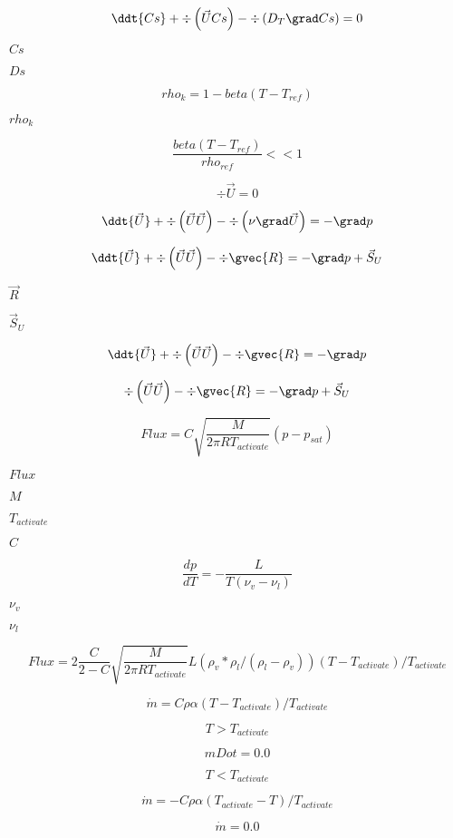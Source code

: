 \documentclass{article}
\begin{document}
\[ \ddt{Cs} + \div \left(\vec{U} Cs\right) - \div \left(D_T \grad Cs \right) = 0 \]
\pagebreak

$ Cs $
\pagebreak

$ Ds $
\pagebreak

\[ rho_{k} = 1 - beta(T - T_{ref}) \]
\pagebreak

$ rho_{k} $
\pagebreak

\[ \frac{beta(T - T_{ref})}{rho_{ref}} << 1 \]
\pagebreak

\[ \div \vec{U} = 0 \]
\pagebreak

\[ \ddt{\vec{U}} + \div \left( \vec{U} \vec{U} \right) - \div \left(\nu \grad \vec{U} \right) = - \grad p \]
\pagebreak

\[ \ddt{\vec{U}} + \div \left( \vec{U} \vec{U} \right) - \div \gvec{R} = - \grad p + \vec{S}_U \]
\pagebreak

$ \vec{R} $
\pagebreak

$ \vec{S}_U $
\pagebreak

\[ \ddt{\vec{U}} + \div \left( \vec{U} \vec{U} \right) - \div \gvec{R} = - \grad p \]
\pagebreak

\[ \div \left( \vec{U} \vec{U} \right) - \div \gvec{R} = - \grad p + \vec{S}_U \]
\pagebreak

\[ Flux = C \sqrt{\frac{M}{2 \pi R T_{activate}}}(p - p_{sat}) \]
\pagebreak

$ Flux $
\pagebreak

$ M $
\pagebreak

$ T_{activate} $
\pagebreak

$ C $
\pagebreak

\[ \frac{dp}{dT} = - \frac{L}{T (\nu_v - \nu_l)} \]
\pagebreak

$ \nu_v $
\pagebreak

$ \nu_l $
\pagebreak

\[ Flux = 2 \frac{C}{2 - C} \sqrt{\frac{M}{2 \pi R T_{activate}}} L (\rho_{v}*\rho_{l}/(\rho_{l} - \rho_{v})) (T - T_{activate})/T_{activate} \]
\pagebreak

\[ \dot{m} = C \rho \alpha (T - T_{activate})/T_{activate} \]
\pagebreak

\[ T > T_{activate} \]
\pagebreak

\[ mDot = 0.0 \]
\pagebreak

\[ T < T_{activate} \]
\pagebreak

\[ \dot{m} = -C \rho \alpha (T_{activate} - T)/T_{activate} \]
\pagebreak

\[ \dot{m} = 0.0 \]
\pagebreak
\end{document}
